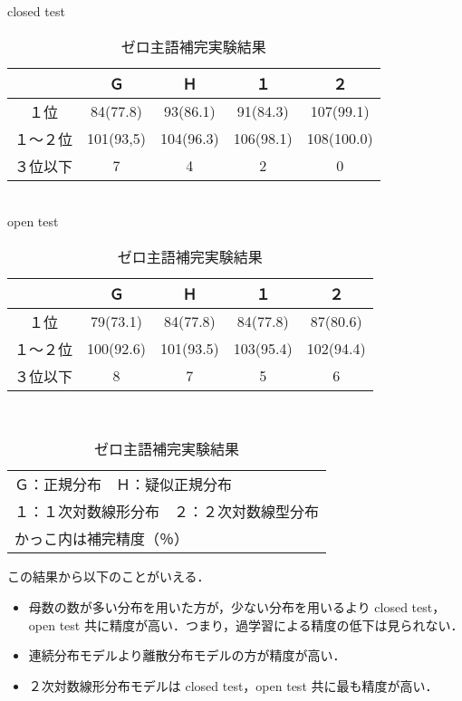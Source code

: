    \begin{table}
   \begin{center}
    \caption{ゼロ主語補完実験結果}
    \label{tab:実験結果}
     closed test
    \vspace{.5\baselineskip}\\
    \begin{tabular}{|c|c|c|c|c|} \hline
             &    Ｇ      &     Ｈ     &     １      &   ２       \\ \hline
    １位     &  84(77.8)  &  93(86.1)  &  91(84.3)   & 107(99.1)  \\
    １〜２位 & 101(93,5)  & 104(96.3)  &  106(98.1)  & 108(100.0) \\
    ３位以下 &   7        &   4        &   2         &   0        \\ \hline
    \end{tabular}
    \vspace{\baselineskip}\\
     open test
    \vspace{.5\baselineskip}\\
    \begin{tabular}{|c|c|c|c|c|} \hline
             &    Ｇ      &     Ｈ     &     １      &   ２       \\ \hline
    １位     &  79(73.1)  &  84(77.8)  &  84(77.8)   &  87(80.6)  \\
    １〜２位 & 100(92.6)  & 101(93.5)  &  103(95.4)  & 102(94.4)  \\
    ３位以下 &   8        &   7        &   5         &   6        \\ \hline
    \end{tabular}
    \vspace{.5\baselineskip}\\
    \begin{tabular}{l}
      Ｇ：正規分布　Ｈ：疑似正規分布 \\
      １：１次対数線形分布　２：２次対数線型分布 \\
      かっこ内は補完精度（％） \\
    \end{tabular}
   \end{center}
   \end{table}
   
この結果から以下のことがいえる．
\begin{itemize}
\item 母数の数が多い分布を用いた方が，少ない分布を用いるより closed test，open test 共に精度が高い．つまり，過学習による精度の低下は見られない．
\item 連続分布モデルより離散分布モデルの方が精度が高い．
\item ２次対数線形分布モデルは closed test，open test 共に最も精度が高い．
\end{itemize}

